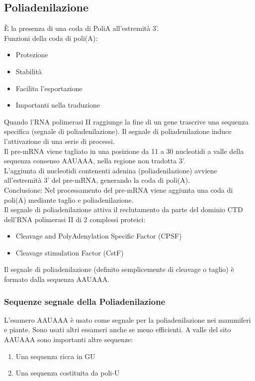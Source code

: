 \documentclass{article}
\begin{document}
\subsection{Poliadenilazione}
È la presenza di una coda di PoliA all'estremità 3'.\\
Funzioni della coda di poli(A):
\begin{itemize}
    \item Protezione
    \item Stabilità
    \item Facilita l'esportazione
    \item Importanti nella traduzione
\end{itemize}
Quando l'RNA polimerasi II raggiunge la fine di un gene trascrive una sequenza specifica (segnale di poliadenilazione). Il segnale di poliadenilazione induce l'attivazione di una serie di processi.\\
Il pre-mRNA viene tagliato in una posizione da 11 a 30 nucleotidi a valle della sequenza consenso AAUAAA, nella regione non tradotta 3'.\\
L'aggiunta di nucleotidi contenenti adenina (poliadenilazione) avviene all'estremità 3' del pre-mRNA, generando la coda di poli(A).\\
Conclusione: Nel processamento del pre-mRNA viene aggiunta una coda di poli(A) mediante taglio e poliadenilazione.\\
Il segnale di poliadenilazione attiva il reclutamento da parte del dominio CTD dell'RNA polimerasi II di 2 complessi proteici:
\begin{itemize}
    \item Cleavage and PolyAdenylation Specific Factor (CPSF)
    \item Cleavage stimulation Factor (CstF)
\end{itemize}
Il segnale di poliadenilazione (definito semplicemente di cleavage o taglio) è formato dalla sequenza AAUAAA.
\subsubsection{Sequenze segnale della Poliadenilazione}
L'esamero AAUAAA è usato come segnale per la poliadenilazione nei mammiferi e piante. Sono usati altri essameri anche se meno efficienti. A valle del sito AAUAAA sono importanti altre sequenze:
\begin{enumerate}
    \item Una sequenza ricca in GU
    \item Una sequenza costituita da poli-U
\end{enumerate}
\end{document}
